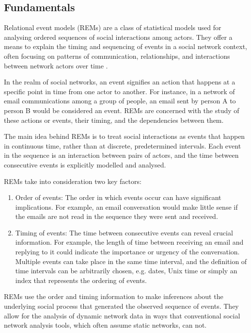 \subsection{Fundamentals}
\label{sec:rem_fundamentals}

Relational event models (REMs) are a class of statistical models used for analysing ordered sequences of social interactions among actors. They offer a means to explain the timing and sequencing of events in a social network context, often focusing on patterns of communication, relationships, and interactions between network actors over time \cite{butts20084}. 

In the realm of social networks, an event signifies an action that happens at a specific point in time from one actor to another. For instance, in a network of email communications among a group of people, an email sent by person A to person B would be considered an event. REMs are concerned with the study of these actions or events, their timing, and the dependencies between them.

The main idea behind REMs is to treat social interactions as events that happen in continuous time, rather than at discrete, predetermined intervals. Each event in the sequence is an interaction between pairs of actors, and the time between consecutive events is explicitly modelled and analysed. 

\noindent REMs take into consideration two key factors:

\begin{enumerate}
	\item Order of events: The order in which events occur can have significant implications. For example, an email conversation would make little sense if the emails are not read in the sequence they were sent and received.
	\item Timing of events: The time between consecutive events can reveal crucial information. For example, the length of time between receiving an email and replying to it could indicate the importance or urgency of the conversation. Multiple events can take place in the same time interval, and the definition of time intervals can be arbitrarily chosen, e.g. dates, Unix time or simply an index that represents the ordering of events.
\end{enumerate}

REMs use the order and timing information to make inferences about the underlying social process that generated the observed sequence of events. They allow for the analysis of dynamic network data in ways that conventional social network analysis tools, which often assume static networks, can not. 

